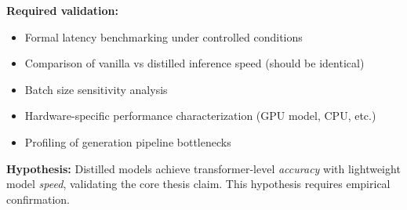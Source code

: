 \textbf{Required validation:}
\begin{itemize}[noitemsep,topsep=0pt]
    \item Formal latency benchmarking under controlled conditions
    \item Comparison of vanilla vs distilled inference speed (should be identical)
    \item Batch size sensitivity analysis
    \item Hardware-specific performance characterization (GPU model, CPU, etc.)
    \item Profiling of generation pipeline bottlenecks
\end{itemize}

\textbf{Hypothesis:} Distilled models achieve transformer-level \emph{accuracy} with lightweight model \emph{speed}, validating the core thesis claim. This hypothesis requires empirical confirmation.


